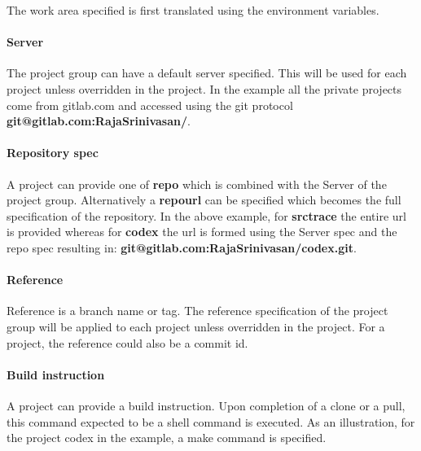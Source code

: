 \documentclass[11pt, a4paper]{article} %
\begin{document}
The work area specified is first translated using the environment variables.

\paragraph{}

\paragraph{Server} The project group can have a default server specified. This will be used for each project unless overridden in the project. In the example all the private projects come from gitlab.com and accessed using the git protocol \textbf{git@gitlab.com:RajaSrinivasan/}. 

\paragraph{Repository spec} A project can provide one of \textbf{repo} which is combined with the Server of the project group. Alternatively a \textbf{repourl} can be specified which becomes the full specification of the repository. In the above example, for \textbf{srctrace} the entire url is provided whereas for \textbf{codex} the url is formed using the Server spec and the repo spec resulting in: \textbf{git@gitlab.com:RajaSrinivasan/codex.git}.

\paragraph{Reference} Reference is a branch name or tag. The reference specification of the project group will be applied to each project unless overridden in the project. For a project, the reference could also be a commit id.

\paragraph{Build instruction} A project can provide a build instruction. Upon completion of a clone or a pull, this command expected to be a shell command is executed. As an illustration, for the project codex in the example, a make command is specified.
\end{document}
